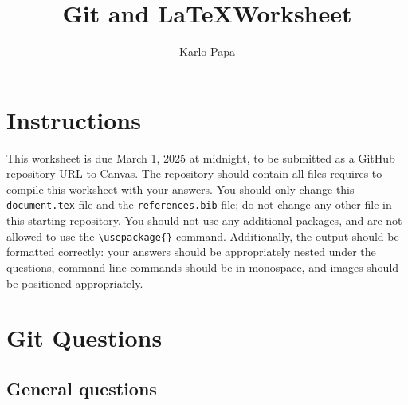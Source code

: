 \documentclass[10pt,twocolumn]{article}
\title{Git and \LaTeX Worksheet}
\author{Karlo Papa}
\affiliation{Occidental College}
\begin{document}
\maketitle

\section{Instructions}

This worksheet is due March 1, 2025 at midnight, to be submitted as a GitHub repository URL to Canvas. The repository should contain all files requires to compile this worksheet with your answers. You should only change this \texttt{document.tex} file and the  \texttt{references.bib} file; do not change any other file in this starting repository. You should not use any additional packages, and are not allowed to use the \texttt{{\textbackslash}usepackage\{\}} command. Additionally, the output should be formatted correctly: your answers should be appropriately nested under the questions, command-line commands should be in monospace, and images should be positioned appropriately.

\section{Git Questions}

\subsection{General questions}
\end{document}
